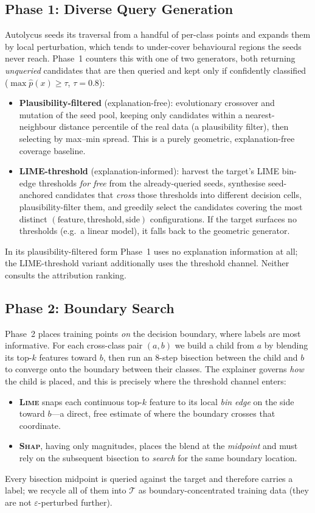 \documentclass[sigconf,anonymous,review]{acmart}
\begin{document}
\subsection{Phase 1: Diverse Query Generation}
\label{subsec:diverse}
Autolycus seeds its traversal from a handful of per-class points and expands them by
local perturbation, which tends to under-cover behavioural regions the seeds never
reach. Phase~1 counters this with one of two generators, both returning \emph{unqueried}
candidates that are then queried and kept only if confidently classified
($\max \hat{p}(x) \ge \tau$, $\tau = 0.8$):
\begin{itemize}
  \item \textbf{Plausibility-filtered} (explanation-free): evolutionary crossover and
  mutation of the seed pool, keeping only candidates within a nearest-neighbour distance
  percentile of the real data (a plausibility filter), then selecting by max--min spread.
  This is a purely geometric, explanation-free coverage baseline.
  \item \textbf{LIME-threshold} (explanation-informed): harvest the target's LIME
  bin-edge thresholds \emph{for free} from the already-queried seeds, synthesise
  seed-anchored candidates that \emph{cross} those thresholds into different decision
  cells, plausibility-filter them, and greedily select the candidates covering the most
  distinct $(\text{feature}, \text{threshold}, \text{side})$ configurations. If the
  target surfaces no thresholds (e.g.\ a linear model), it falls back to the geometric
  generator.
\end{itemize}
In its plausibility-filtered form Phase~1 uses no explanation information at all; the
LIME-threshold variant additionally uses the threshold channel. Neither consults the
attribution ranking.

\subsection{Phase 2: Boundary Search}
\label{subsec:boundary}
Phase~2 places training points \emph{on} the decision boundary, where labels are most
informative. For each cross-class pair $(a,b)$ we build a child from $a$ by blending its
top-$k$ features toward $b$, then run an $8$-step bisection between the child and $b$ to
converge onto the boundary between their classes. The explainer governs \emph{how} the
child is placed, and this is precisely where the threshold channel enters:
\begin{itemize}
  \item \textbf{\textsc{Lime}} snaps each continuous top-$k$ feature to its local
  \emph{bin edge} on the side toward $b$---a direct, free estimate of where the boundary
  crosses that coordinate.
  \item \textbf{\textsc{Shap}}, having only magnitudes, places the blend at the
  \emph{midpoint} and must rely on the subsequent bisection to \emph{search} for the
  same boundary location.
\end{itemize}
Every bisection midpoint is queried against the target and therefore carries a label; we
recycle all of them into $\mathcal{T}$ as boundary-concentrated training data (they are
not $\varepsilon$-perturbed further).
\end{document}
